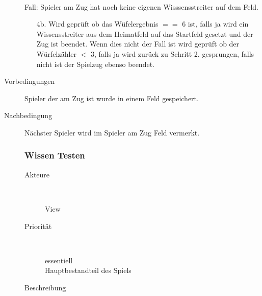 \documentclass{report}
\begin{document}
\begin{description}
\begin{itemize}
            \end{itemize}
            \\ Fall: Spieler am Zug hat noch keine eigenen Wisssensstreiter auf dem Feld.
            \begin{itemize}
                \item [4b.] Wird geprüft ob das Wüfelergebnis $==$ 6 ist, falls ja wird ein Wissensstreiter aus dem Heimatfeld auf das Startfeld gesetzt und der Zug ist beendet. Wenn dies nicht der Fall ist wird geprüft ob der Würfelzähler $<$ 3, falls ja wird zurück zu Schritt 2. gesprungen, falls nicht ist der Spielzug ebenso beendet.
            \end{itemize}
       \item[Vorbedingungen] Spieler der am Zug ist wurde in einem Feld gespeichert.
       \item[Nachbedingung] Nächster Spieler wird im Spieler am Zug Feld vermerkt.

    \subsubsection{Wissen Testen}
    \begin{description}
        \item[Akteure]~\par
            View
        \item[Priorität]~\par
            essentiell\\Hauptbestandteil des Spiels
        \item[Beschreibung]~\par


\end{description}
\end{description}
\end{document}
